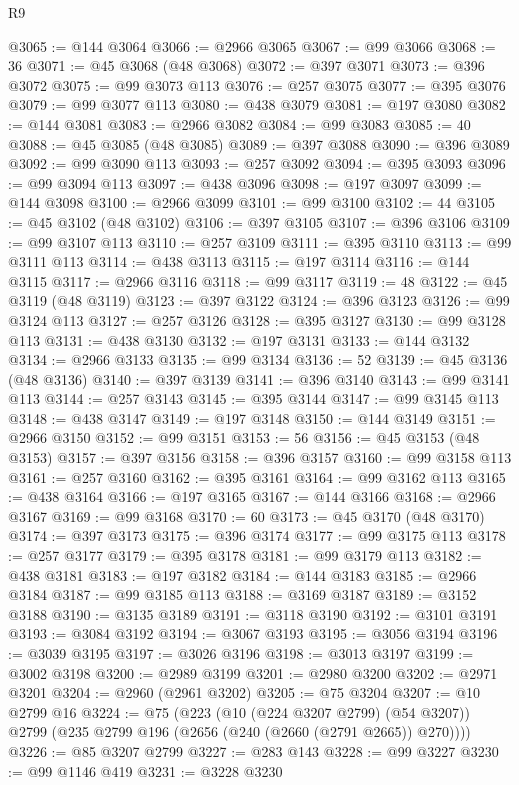 \begin{lexlean}{R9}
\begin{coremodule}
{{{{{{{{{{{{{{{{{{{{{{{{{{{{{{{{{{{{{{{{{{{{{{{{{{{{{{{{{{{{{{{{{{{{{{{{{{{{{{{{{{{{@3065 := @144 @3064
@3066 := @2966 @3065
@3067 := @99 @3066
@3068 := 36
@3071 := @45 @3068 (@48 @3068)
@3072 := @397 @3071
@3073 := @396 @3072
@3075 := @99 @3073 @113
@3076 := @257 @3075
@3077 := @395 @3076
@3079 := @99 @3077 @113
@3080 := @438 @3079
@3081 := @197 @3080
@3082 := @144 @3081
@3083 := @2966 @3082
@3084 := @99 @3083
@3085 := 40
@3088 := @45 @3085 (@48 @3085)
@3089 := @397 @3088
@3090 := @396 @3089
@3092 := @99 @3090 @113
@3093 := @257 @3092
@3094 := @395 @3093
@3096 := @99 @3094 @113
@3097 := @438 @3096
@3098 := @197 @3097
@3099 := @144 @3098
@3100 := @2966 @3099
@3101 := @99 @3100
@3102 := 44
@3105 := @45 @3102 (@48 @3102)
@3106 := @397 @3105
@3107 := @396 @3106
@3109 := @99 @3107 @113
@3110 := @257 @3109
@3111 := @395 @3110
@3113 := @99 @3111 @113
@3114 := @438 @3113
@3115 := @197 @3114
@3116 := @144 @3115
@3117 := @2966 @3116
@3118 := @99 @3117
@3119 := 48
@3122 := @45 @3119 (@48 @3119)
@3123 := @397 @3122
@3124 := @396 @3123
@3126 := @99 @3124 @113
@3127 := @257 @3126
@3128 := @395 @3127
@3130 := @99 @3128 @113
@3131 := @438 @3130
@3132 := @197 @3131
@3133 := @144 @3132
@3134 := @2966 @3133
@3135 := @99 @3134
@3136 := 52
@3139 := @45 @3136 (@48 @3136)
@3140 := @397 @3139
@3141 := @396 @3140
@3143 := @99 @3141 @113
@3144 := @257 @3143
@3145 := @395 @3144
@3147 := @99 @3145 @113
@3148 := @438 @3147
@3149 := @197 @3148
@3150 := @144 @3149
@3151 := @2966 @3150
@3152 := @99 @3151
@3153 := 56
@3156 := @45 @3153 (@48 @3153)
@3157 := @397 @3156
@3158 := @396 @3157
@3160 := @99 @3158 @113
@3161 := @257 @3160
@3162 := @395 @3161
@3164 := @99 @3162 @113
@3165 := @438 @3164
@3166 := @197 @3165
@3167 := @144 @3166
@3168 := @2966 @3167
@3169 := @99 @3168
@3170 := 60
@3173 := @45 @3170 (@48 @3170)
@3174 := @397 @3173
@3175 := @396 @3174
@3177 := @99 @3175 @113
@3178 := @257 @3177
@3179 := @395 @3178
@3181 := @99 @3179 @113
@3182 := @438 @3181
@3183 := @197 @3182
@3184 := @144 @3183
@3185 := @2966 @3184
@3187 := @99 @3185 @113
@3188 := @3169 @3187
@3189 := @3152 @3188
@3190 := @3135 @3189
@3191 := @3118 @3190
@3192 := @3101 @3191
@3193 := @3084 @3192
@3194 := @3067 @3193
@3195 := @3056 @3194
@3196 := @3039 @3195
@3197 := @3026 @3196
@3198 := @3013 @3197
@3199 := @3002 @3198
@3200 := @2989 @3199
@3201 := @2980 @3200
@3202 := @2971 @3201
@3204 := @2960 (@2961 @3202)
@3205 := @75 @3204
@3207 := @10 @2799 @16
@3224 := @75
    (@223
      (@10 (@224 @3207 @2799) (@54 @3207))
      @2799
      (@235 @2799 @196 (@2656 (@240 (@2660 (@2791 @2665)) @270))))
@3226 := @85 @3207 @2799
@3227 := @283 @143
@3228 := @99 @3227
@3230 := @99 @1146 @419
@3231 := @3228 @3230
}}}}}}}}}}}}}}}}}}}}}}}}}}}}}}}}}}}}}}}}}}}}}}}}}}}}}}}}}}}}}}}}}}}}}}}}}}}}}}}}}}}}
\end{coremodule}
\end{lexlean}
